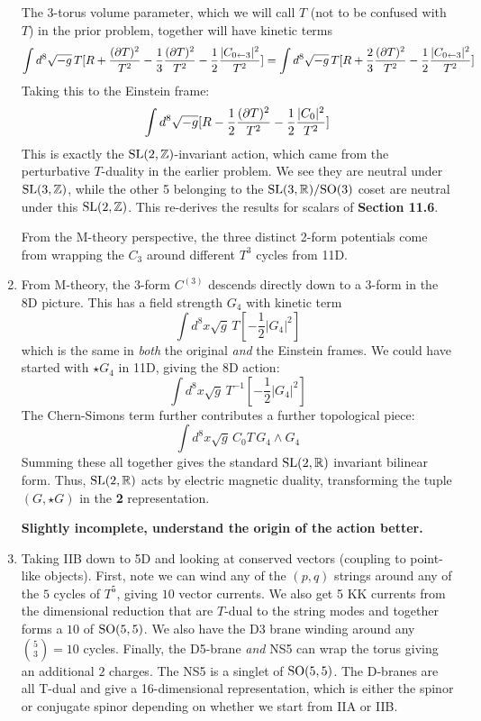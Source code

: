 \documentclass[11pt, class=article, crop=false]{standalone}
\begin{document}
\begin{enumerate}
	The 3-torus volume parameter, which we will call $T$ (not to be confused with $T$) in the prior problem, together will have kinetic terms
	\[
		\int d^8 \sqrt{-g}\, T [R + \frac{(\partial T)^2}{T^2} - \frac13 \frac{(\partial T)^2}{T^2} - \frac12 \frac{|C_{0 \leftarrow 3}|^2}{T^2}] = \int d^8 \sqrt{-g}\, T [R + \frac23 \frac{(\partial T)^2}{T^2} - \frac12 \frac{|C_{0 \leftarrow 3}|^2}{T^2}]
	\]
	Taking this to the Einstein frame:
	\[
		\int d^8 \sqrt{-g} [R - \frac12 \frac{(\partial T)^2}{T^2} - \frac12 \frac{|C_0|^2}{T^2}]
	\]
	This is exactly the $\mathrm{SL}(2, \mathbb{Z})$-invariant action, which came from the perturbative $T$-duality in the earlier problem. We see they are neutral under $\mathrm{SL}(3, \mathbb{Z})$, while the other 5 belonging to the $\mathrm{SL}(3, \mathbb{R})/\mathrm{SO}(3)$ coset are neutral under this $\mathrm{SL}(2, \mathbb{Z})$. This re-derives the results for scalars of \textbf{Section 11.6}.
	
	From the M-theory perspective, the three distinct 2-form potentials come from wrapping the $C_3$ around different $T^3$ cycles from 11D. 
	
	\item From M-theory, the $3$-form $C^{(3)}$ descends directly down to a 3-form in the 8D picture. This has a field strength $G_4$ with kinetic term
	\[
		\int d^8 x \sqrt{g} \, T \left[- \frac12 |G_4|^2 \right] 
	\]
	which is the same in \emph{both} the original \emph{and} the Einstein frames. We could have started with $\star G_4$ in 11D, giving the 8D action:
	\[
		\int d^8 x \sqrt{g} \, T^{-1} \left[- \frac12 |G_4|^2 \right] 
	\]
	The Chern-Simons term further contributes a further topological piece:
	\[
		 \int d^8 x \sqrt{g}\, C_0 T \, G_4 \wedge G_4
	\]
	Summing these all together gives the standard $\mathrm{SL}(2, \mathbb{R})$ invariant bilinear form.  Thus, $\mathrm{SL}(2,\mathbb{R})$ acts by electric magnetic duality, transforming the tuple $(G, \star G)$ in the \textbf{2} representation. 
	
	\textbf{Slightly incomplete, understand the origin of the action better.}
	
	\item Taking IIB down to 5D and looking at conserved vectors (coupling to point-like objects). First, note we can wind any of the $(p,q)$ strings around any of the $5$ cycles of $T^5$, giving $10$ vector currents. We also get 5 KK currents from the dimensional reduction that are $T$-dual to the string modes and together forms a $10$ of $\mathrm{SO}(5,5)$. We also have the D3 brane winding around any ${5 \choose 3} = 10$ cycles. Finally, the D5-brane \emph{and} NS5 can wrap the torus giving an additional $2$ charges. The NS5 is a singlet of $\mathrm{SO}(5,5)$. The D-branes are all T-dual and give a 16-dimensional representation, which is either the spinor or conjugate spinor depending on whether we start from IIA or IIB. 
	

\end{enumerate}
\end{document}
